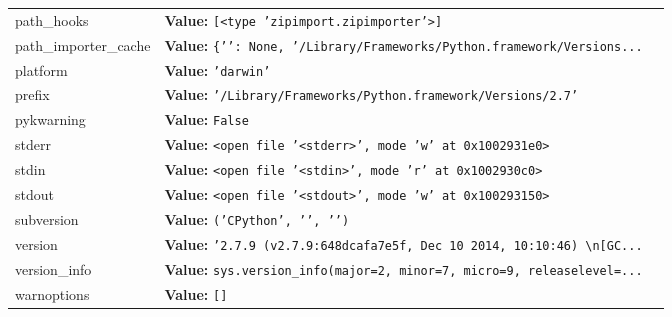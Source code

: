 \begin{longtable}{|p{\varnamewidth}|p{\vardescrwidth}|l}
\cline{1-2}
\raggedright p\-a\-t\-h\-\_\-h\-o\-o\-k\-s\- & \raggedright \textbf{Value:} 
{\tt \texttt{[}{\textless}type 'zipimport.zipimporter'{\textgreater}\texttt{]}}&\\
\cline{1-2}
\raggedright p\-a\-t\-h\-\_\-i\-m\-p\-o\-r\-t\-e\-r\-\_\-c\-a\-c\-h\-e\- & \raggedright \textbf{Value:} 
{\tt \texttt{\{}\texttt{'}\texttt{}\texttt{'}\texttt{: }None\texttt{, }\texttt{'}\texttt{/Library/Frameworks/Python.framework/Versions}\texttt{...}}&\\
\cline{1-2}
\raggedright p\-l\-a\-t\-f\-o\-r\-m\- & \raggedright \textbf{Value:} 
{\tt \texttt{'}\texttt{darwin}\texttt{'}}&\\
\cline{1-2}
\raggedright p\-r\-e\-f\-i\-x\- & \raggedright \textbf{Value:} 
{\tt \texttt{'}\texttt{/Library/Frameworks/Python.framework/Versions/2.7}\texttt{'}}&\\
\cline{1-2}
\raggedright p\-y\-3\-k\-w\-a\-r\-n\-i\-n\-g\- & \raggedright \textbf{Value:} 
{\tt False}&\\
\cline{1-2}
\raggedright s\-t\-d\-e\-r\-r\- & \raggedright \textbf{Value:} 
{\tt {\textless}open file '{\textless}stderr{\textgreater}', mode 'w' at 0x1002931e0{\textgreater}}&\\
\cline{1-2}
\raggedright s\-t\-d\-i\-n\- & \raggedright \textbf{Value:} 
{\tt {\textless}open file '{\textless}stdin{\textgreater}', mode 'r' at 0x1002930c0{\textgreater}}&\\
\cline{1-2}
\raggedright s\-t\-d\-o\-u\-t\- & \raggedright \textbf{Value:} 
{\tt {\textless}open file '{\textless}stdout{\textgreater}', mode 'w' at 0x100293150{\textgreater}}&\\
\cline{1-2}
\raggedright s\-u\-b\-v\-e\-r\-s\-i\-o\-n\- & \raggedright \textbf{Value:} 
{\tt \texttt{(}\texttt{'}\texttt{CPython}\texttt{'}\texttt{, }\texttt{'}\texttt{}\texttt{'}\texttt{, }\texttt{'}\texttt{}\texttt{'}\texttt{)}}&\\
\cline{1-2}
\raggedright v\-e\-r\-s\-i\-o\-n\- & \raggedright \textbf{Value:} 
{\tt \texttt{'}\texttt{2.7.9 (v2.7.9:648dcafa7e5f, Dec 10 2014, 10:10:46) {\textbackslash}n[GC}\texttt{...}}&\\
\cline{1-2}
\raggedright v\-e\-r\-s\-i\-o\-n\-\_\-i\-n\-f\-o\- & \raggedright \textbf{Value:} 
{\tt sys.version\_info(major=2, minor=7, micro=9, releaselevel=\texttt{...}}&\\
\cline{1-2}
\raggedright w\-a\-r\-n\-o\-p\-t\-i\-o\-n\-s\- & \raggedright \textbf{Value:} 
{\tt \texttt{[}\texttt{]}}&\\
\cline{1-2}
\end{longtable}

